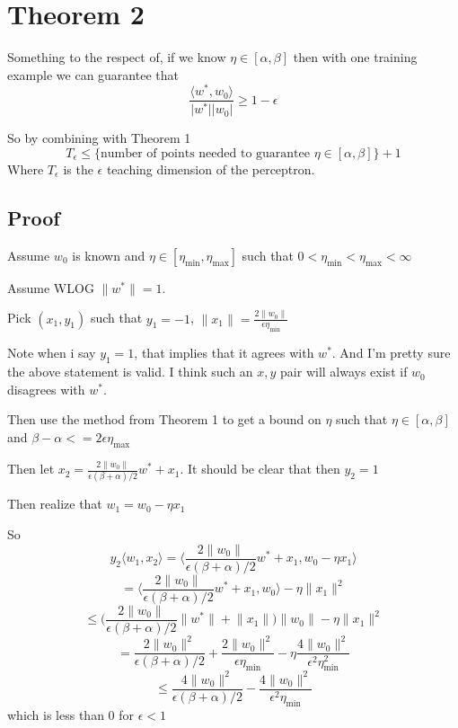 \documentclass{article}
\begin{document}
\section*{Theorem 2}
\color{red}

Something to the respect of, if we know $\eta \in [\alpha, \beta]$ then with one training example we can guarantee that
$$
\frac{\langle w^*, w_0 \rangle}{\lvert w^* \rvert \lvert w_0 \rvert} \geq 1 - \epsilon
$$

So by combining with Theorem 1
$$
T_\epsilon \leq \{\text{number of points needed to guarantee } \eta \in [\alpha, \beta]\} +1 
$$
Where $T_\epsilon$ is the $\epsilon$ teaching dimension of the perceptron.
\color{black}

\subsection*{Proof}


Assume $w_0$ is known and $\eta \in [\eta_{\min} , \eta_{\max}] $ such that 
$0 < \eta_{\min} < \eta_{\max} < \infty$

Assume WLOG $\lVert w^* \rVert = 1$.

Pick $(x_1,y_1)$ such that $y_1 = -1$, $\lVert x_1 \rVert = \frac{2 \lVert w_0 \rVert}{\epsilon \eta_{\min}}$

\color{red}
Note when i say $y_1 = 1$, that implies that it agrees with $w^*$. And I'm pretty 
sure the above statement is valid. I think such an $x,y$ pair will always exist if
$w_0$ disagrees with $w^*$.
\color{black}

Then use the method from Theorem 1 to get a bound on $\eta$ such that $\eta \in [\alpha , \beta]$ and $\beta - \alpha <= 2\epsilon \eta_{\max}$

Then let $x_2 = \frac{2 \lVert w_0 \rVert}{\epsilon (\beta + \alpha)/2}w^* + x_1$.
It should be clear that then $y_2 = 1$

Then realize that
$w_1 = w_0 - \eta x_1$

So
$$
y_2 \langle w_1, x_2 \rangle  = \bigg\langle \frac{2 \lVert w_0 \rVert}{\epsilon (\beta + \alpha) /2} w^* + x_1 , w_0 - \eta x_1 \bigg\rangle
$$
$$
= \bigg\langle \frac{2 \lVert w_0 \rVert}{\epsilon (\beta + \alpha) /2} w^* + x_1 , w_0  \bigg\rangle - \eta \lVert x_1 \rVert^2
$$
$$
\leq \bigg( \frac{2 \lVert w_0 \rVert}{\epsilon (\beta + \alpha) /2} \lVert w^* \rVert + \lVert x_1 \rVert \bigg ) \lVert w_0 \rVert - \eta \lVert x_1 \rVert^2
$$
$$
= \frac{2 \lVert w_0 \rVert^2}{\epsilon (\beta + \alpha)/2} + \frac{2 \lVert w_0 \rVert ^2}{\epsilon \eta_{\min}} - \eta \frac{4 \lVert w_0 \rVert^2}{\epsilon^2 \eta_{\min}^2}
$$
$$
\leq \frac{4 \lVert w_0 \rVert^2}{\epsilon (\beta + \alpha)/2}  -  \frac{4 \lVert w_0 \rVert^2}{\epsilon^2 \eta_{\min}}
$$
which is less than $0$ for $\epsilon < 1$
\end{document}
